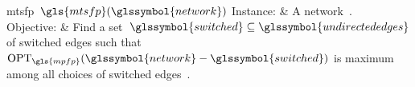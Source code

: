 \begin{problem}[framed]{\acrlong{mtsfp}~$\gls{mtsfp}(\glssymbol{network})$}%
    Instance: & A network~.\\
    Objective: & Find a
    set~$\glssymbol{switched}\subseteq\glssymbol{undirectededges}$ of switched
    edges such
    that~$\opt_{\gls{mpfp}}(\glssymbol{network}-\glssymbol{switched})$ is maximum
    among all choices of switched edges~.
\end{problem}%